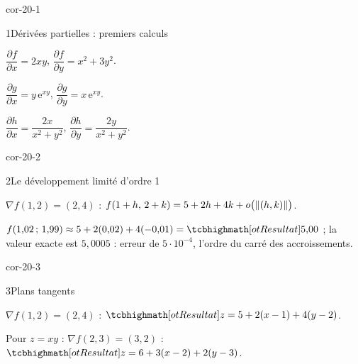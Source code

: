 
\corrigesSouples

\begin{blocLivre}{cor-20-1}
\begin{corrige}{1}{Dérivées partielles : premiers calculs}
\begin{questions}
  \item $\dfrac{\partial f}{\partial x}=2xy$,
    $\dfrac{\partial f}{\partial y}=x^{2}+3y^{2}$.
  \item $\dfrac{\partial g}{\partial x}=y\,\mathrm{e}^{xy}$,
    $\dfrac{\partial g}{\partial y}=x\,\mathrm{e}^{xy}$.
  \item $\dfrac{\partial h}{\partial x}=\dfrac{2x}{x^{2}+y^{2}}$,
    $\dfrac{\partial h}{\partial y}=\dfrac{2y}{x^{2}+y^{2}}$.
\end{questions}
\end{corrige}
\end{blocLivre}

\begin{blocLivre}{cor-20-2}
\begin{corrige}{2}{Le développement limité d'ordre 1}
\begin{questions}
  \item $\nabla f(1,2)=(2,4)$ :
    $f(1+h,\,2+k)=5+2h+4k+o\bigl(\left\lVert(h,k)\right\rVert\bigr)$.
  \item $f(1{,}02\,;\,1{,}99)\approx5+2(0{,}02)+4(-0{,}01)=\res{5{,}00}$ ;
    la valeur exacte est $5{,}0005$ : erreur de $5\cdot10^{-4}$, l'ordre
    du carré des accroissements.
\end{questions}
\end{corrige}
\end{blocLivre}

\begin{blocLivre}{cor-20-3}
\begin{corrige}{3}{Plans tangents}
\begin{questions}
  \item $\nabla f(1,2)=(2,4)$ :
    $\res{z=5+2(x-1)+4(y-2)}$.
  \item Pour $z=xy$ : $\nabla f(2,3)=(3,2)$ :
    $\res{z=6+3(x-2)+2(y-3)}$.
\end{questions}
\end{corrige}
\end{blocLivre}

